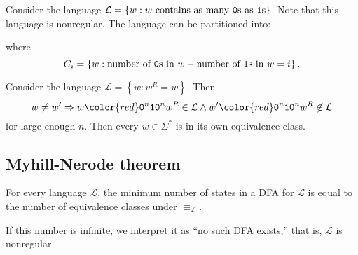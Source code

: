 \documentclass{notes}
\begin{document}
\begin{eg}
  Consider the language $\mathcal L = \left \{ w : \text{$w$ contains as many \verb~0~s as \verb~1~s} \right \}$.
  Note that this language is nonregular.
  The language can be partitioned into: 
  
  \begin{center}
  \end{center}
  
  where 
  \[
    C_i = \left \{ w : \text{number of \verb~0~s in $w$} - \text{number of \verb~1~s in $w$} = i \right \}.
  \]
\end{eg}

\begin{eg}
  Consider the language $\mathcal L = \left \{ w : w^R = w \right \}$.
  Then 
  \[
    w \neq w' \Rightarrow w {\color{red} \verb~0~^n \verb~1~ \verb~0~^n w^R} \in \mathcal L \land w' {\color{red} \verb~0~^n \verb~1~ \verb~0~^n w^R} \not \in \mathcal L
  \]
  for large enough $n$.
  Then every $w \in \Sigma^*$ is in its own equivalence class.
\end{eg}

\subsection{Myhill-Nerode theorem}

\begin{thm}
  For every language $\mathcal L$, the minimum number of states in a DFA for $\mathcal L$ is equal to the number of equivalence classes under $\equiv_\mathcal L$.
  
  If this number is infinite, we interpret it as ``no such DFA exists,'' that is, $\mathcal L$ is nonregular.
\end{thm}
\end{document}
